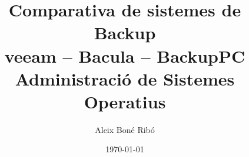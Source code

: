 



\usepackage{pifont}

\title{Comparativa de sistemes de Backup \\
    \normalfont veeam \--- Bacula \--- BackupPC \\ \vspace{1em}
\Large \normalfont Administració de Sistemes Operatius}
\author{Aleix Bon\'e Rib\'o}
\date{\today}




    



    \tableofcontents



    \setlength{\parskip}{1em plus 0.5em minus 0.2em}

    
    
    
    
    


    \printbibliography[heading=bibintoc]


